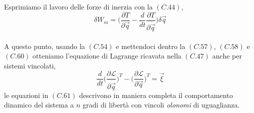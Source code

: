Esprimiamo il lavoro delle forze di inerzia con la $(C.44)$,
\begin{equation}
	\delta W_m = \Biggl( \frac{\partial T}{\partial \vec{q}} - \frac{d}{dt} \frac{\partial T}{\partial \dot{\vec{q}}} \Biggr) \delta \vec{q}
\end{equation}

\paragraph{}
A questo punto, usando la $(C.54)$ e mettendoci dentro la $(C.57)$, $(C.58)$ e $(C.60)$ otteniamo l'equazione di Lagrange ricavata nella $(C.47)$ anche per sistemi vincolati,
\begin{equation}
	\frac{d}{dt} \Biggl( \frac{\partial \mathcal{L}}{\partial \dot{\vec{q}}} \Biggr)^T - \Biggl( \frac{\partial \mathcal{L}}{\partial \vec{q}} \Biggr)^T = \vec{\xi}
\end{equation}
le equazioni in $(C.61)$ descrivono in maniera completa il comportamento dinamico del sistema a $n$ gradi di libertà con vincoli \emph{olonomi} di uguaglianza.
